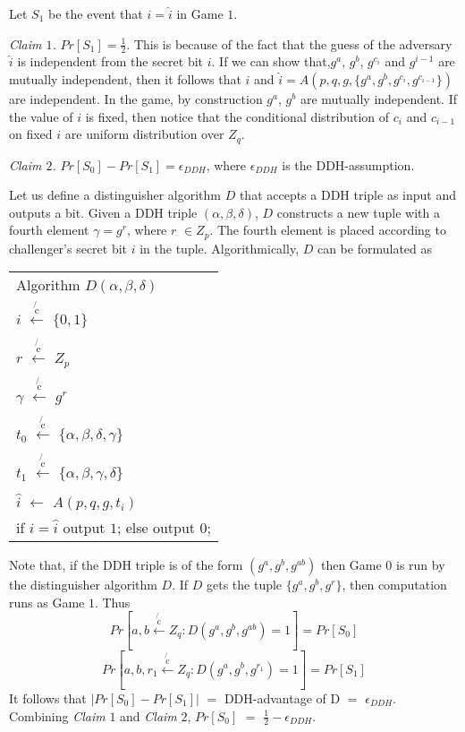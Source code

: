 \documentclass{article}
\begin{document}
\begin{enumerate}
Let $S_1$ be the event that $i = \hat{i}$ in Game $1$.

\textit{Claim $1$.} $Pr[S_1]=\frac{1}{2}$. 
This is because of the fact that the guess of the adversary $\hat{i}$ is independent from the secret bit $i$. If we can show that,$g^a$, $g^b$, $g^{c_i}$ and $g^{i-1}$ are mutually independent, then it follows that $i$ and $\hat{i}=A(p,q,g,\{g^a,g^b,g^{c_i},g^{c_{i-1}}\})$ are independent. In the game, by construction $g^a$, $g^b$ are mutually independent. If the value of $i$ is fixed, then notice that the conditional distribution of $c_i$ and $c_{i-1}$ on fixed $i$ are uniform distribution over $Z_q$. 

\textit{Claim $2$.} $Pr[S_0] - Pr[S_1] = \epsilon_{DDH}$, where $\epsilon_{DDH}$ is the DDH-assumption. 

Let us define a distinguisher algorithm $D$ that accepts a DDH triple as input and outputs a bit.
Given a DDH triple $(\alpha, \beta, \delta)$, $D$ constructs a new tuple with a fourth element $\gamma = g^{r}$, where $r$ $\in Z_p$. The fourth element is placed according to challenger's secret bit $i$ in the tuple. Algorithmically, $D$ can be formulated as

\begin{center}
\begin{tabular} {l}
Algorithm $D(\alpha,\beta,\delta)$ \\
$i$ $\xleftarrow[]{\not{\text{c}}}$ $\{0,1\}$ \\
$r$ $\xleftarrow[]{\not{\text{c}}}$ $Z_p$\\
$\gamma$ $\xleftarrow[]{\not{\text{c}}}$ $g^r$\\
$t_0$ $\xleftarrow[]{\not{\text{c}}}$ $\{\alpha,\beta,\delta,\gamma\}$\\
$t_1$ $\xleftarrow[]{\not{\text{c}}}$ $\{\alpha,\beta,\gamma,\delta\}$\\
$\hat{i}$ $\leftarrow$ $A(p,q,g,t_i)$\\
if $i=\hat{i}$ output $1$;
else output $0$;
\end{tabular}
\end{center}


Note that, if the DDH triple is of the form $(g^a,g^b,g^{ab})$ then Game 0 is run by the distinguisher algorithm $D$.
If $D$ gets the tuple $\{g^a,g^b,g^{r}\}$, then computation runs as Game $1$. Thus
\begin{equation}
Pr[a,b \xleftarrow[]{\not{\text{c}}} Z_q:D(g^a,g^b,g^{ab})=1 ] = Pr[S_0]
\end{equation}
\begin{equation}
Pr[a,b,{r_1} \xleftarrow[]{\not{\text{c}}} Z_q:D(g^a,g^b,g^{r_1})=1 ] = Pr[S_1]
\end{equation}
It follows that $|Pr[S_0] - Pr[S_1]|$ $=$ DDH-advantage of D $=$ $\epsilon_{DDH}$.
Combining \textit{Claim} $1$ and \textit{Claim} $2$, $Pr[S_0]$ $=$ $\frac{1}{2} - \epsilon_{DDH}$.


\end{enumerate}
\end{document}
